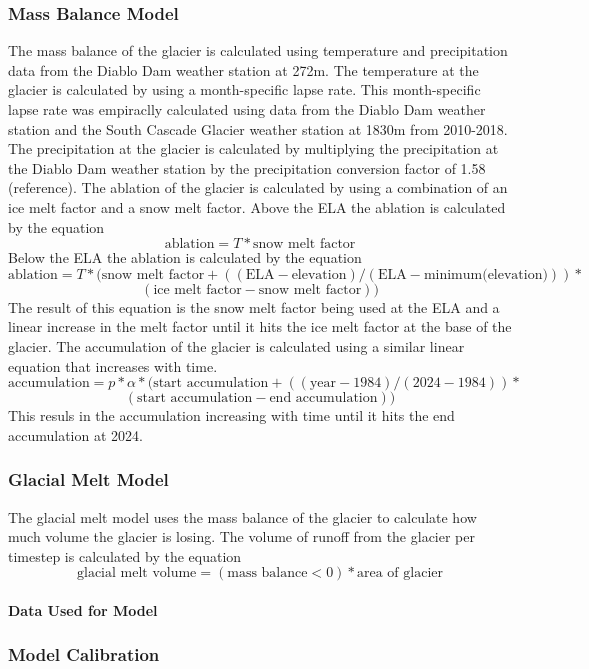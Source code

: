 \documentclass{article}
\begin{document}
\subsubsection{Mass Balance Model}
The mass balance of the glacier is calculated using temperature and precipitation data from the Diablo Dam weather station at 272m. The 
temperature at the glacier is calculated by using a month-specific lapse rate. This month-specific lapse rate was empiraclly calculated using
data from the Diablo Dam weather station and the South Cascade Glacier weather station at 1830m from 2010-2018. The precipitation at the 
glacier is calculated by multiplying the precipitation at the Diablo Dam weather station by the precipitation conversion factor of 1.58 
(reference). The ablation of the glacier is calculated by using a combination of an ice melt factor and a snow melt factor. Above the ELA the 
ablation is calculated by the equation
$$\text{ablation}=T*\text{snow melt factor}$$
Below the ELA the ablation is calculated by the equation
$$\text{ablation}=T*(\text{snow melt factor}+((\text{ELA}-\text{elevation})/(\text{ELA}-\text{minimum(elevation)}))*$$
$$(\text{ice melt factor}-\text{snow melt factor}))$$
The result of this equation is the snow melt factor being used at the ELA and a linear increase in the melt factor until it hits the ice melt 
factor at the base of the glacier. 
The accumulation of the glacier is calculated using a similar linear equation that increases with time.
$$\text{accumulation}=p*\alpha*(\text{start accumulation}+((\text{year}-1984)/(2024-1984))*$$
$$(\text{start accumulation}-\text{end accumulation}))$$
This resuls in the accumulation increasing with time until it hits the end accumulation at 2024. 
\subsubsection{Glacial Melt Model}
The glacial melt model uses the mass balance of the glacier to calculate how much volume the glacier is losing. The volume of runoff from the 
glacier per timestep is calculated by the equation
$$\text{glacial melt volume}=(\text{mass balance}<0)*\text{area of glacier}$$
\paragraph{Data Used for Model}

\subsubsection{Model Calibration}
\end{document}
